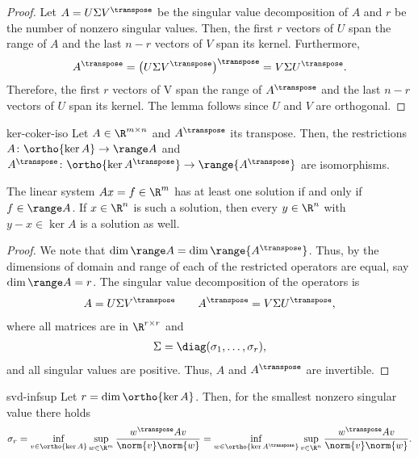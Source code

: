 \begin{proof}
  Let $A=U\Sigma V^\transpose$ be the singular value decomposition of $A$ and
  $r$ be the number of nonzero singular values. Then, the first $r$
  vectors of $U$ span the range of $A$ and the last $n-r$ vectors of
  $V$ span its kernel. Furthermore,
  \begin{gather}
    A^\transpose = \bigl(U\Sigma V^\transpose\bigr)^\transpose = V \Sigma U^\transpose.
  \end{gather}
  Therefore, the first $r$ vectors of V span the range of
  $A^\transpose$ and the last $n-r$ vectors of $U$ span its
  kernel. The lemma follows since $U$ and $V$ are orthogonal.
\end{proof}

\begin{Corollary}{ker-coker-iso}
  Let $A\in \R^{m\times n}$ and $A^\transpose$ its transpose. Then, the
  restrictions $A\colon \ortho{\ker A} \to \range A$ and $A^\transpose\colon
  \ortho{\ker{A^\transpose}} \to \range{A^\transpose}$ are isomorphisms.
  
  The linear system $Ax=f\in\R^m$ has at least one solution if and
  only if $f\in \range A$. If $x\in\R^n$ is such a solution, then
  every $y\in\R^n$ with $y-x\in\ker A$ is a solution as well.
\end{Corollary}

\begin{proof}
  We note that $\dim \range A = \dim \range{A^\transpose}$. Thus, by
   the dimensions of domain and range of
  each of the restricted operators are equal, say $\dim \range A =
  r$. The singular value decomposition of the operators is
  \begin{gather}
    A = U\Sigma V^\transpose \qquad A^\transpose = V\Sigma U^\transpose,
  \end{gather}
  where all matrices are in $\R^{r\times r}$ and
  \begin{gather}
    \Sigma = \diag(\sigma_1,\dots,\sigma_r),
  \end{gather}
  and all singular values are positive. Thus, $A$ and $A^\transpose$ are invertible.
\end{proof}

\begin{Corollary}{svd-infsup}
  Let $r=\dim \ortho{\ker A}$. Then, for the smallest nonzero singular
  value there holds
  \begin{gather}
    \label{eq:infsup:6}
    \sigma_r
    = \inf_{v\in \ortho{\ker A}} \sup_{w\in \R^m} \frac{w^\transpose A v}{\norm{v}\norm{w}}
    = \inf_{w\in \ortho{\ker{A^\transpose}}} \sup_{v\in \R^n} \frac{w^\transpose A v}{\norm{v}\norm{w}}.
  \end{gather}
\end{Corollary}

